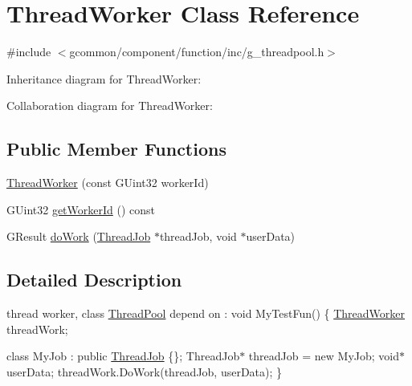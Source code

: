 \hypertarget{class_thread_worker}{\section{Thread\-Worker Class Reference}
\label{class_thread_worker}
}


{\ttfamily \#include $<$gcommon/component/function/inc/g\-\_\-threadpool.\-h$>$}



Inheritance diagram for Thread\-Worker\-:


Collaboration diagram for Thread\-Worker\-:
\subsection*{Public Member Functions}
\begin{DoxyCompactItemize}
\item 
\hyperlink{class_thread_worker_aab0b03ce7564a625cc37b091be3eddcd}{Thread\-Worker} (const G\-Uint32 worker\-Id)
\item 
G\-Uint32 \hyperlink{class_thread_worker_a70bf08819fe584ec99aa22955895a24a}{get\-Worker\-Id} () const 
\item 
G\-Result \hyperlink{class_thread_worker_adba37834fdaa63a62eb10e6c145cfbc5}{do\-Work} (\hyperlink{class_thread_job}{Thread\-Job} $\ast$thread\-Job, void $\ast$user\-Data)
\end{DoxyCompactItemize}


\subsection{Detailed Description}
thread worker, class \hyperlink{class_thread_pool}{Thread\-Pool} depend on \-: void My\-Test\-Fun() \{ \hyperlink{class_thread_worker}{Thread\-Worker} thread\-Work;

class My\-Job \-: public \hyperlink{class_thread_job}{Thread\-Job} \{\}; Thread\-Job$\ast$ thread\-Job = new My\-Job; void$\ast$ user\-Data; thread\-Work.\-Do\-Work(thread\-Job, user\-Data); \} 

